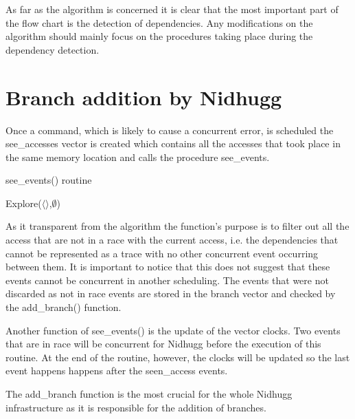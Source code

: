 As far as the algorithm is concerned it is clear that the most important part of the flow chart is the detection of dependencies. Any
modifications on the algorithm should mainly focus on the procedures taking place during the dependency detection.


\section{Branch addition by Nidhugg}

Once a command, which is likely to cause a concurrent error, is scheduled the see\_accesses vector is created which contains all the accesses that took place
in the same memory location and calls the procedure see\_events.

\begin{algorithm}
    \caption{see\_events() routine}
    Explore($\langle \rangle$,$\emptyset$)\;
\end{algorithm}

As it transparent from the algorithm the function's purpose is to filter out all the access that are not in a race with the current access,
i.e. the dependencies that cannot be represented as a trace with no other concurrent event occurring between them. It is important to notice
that this does not suggest that these events cannot be concurrent in another scheduling. The events that were not discarded as not in race events
are stored in the branch vector and checked by the add\_branch() function.

Another function of see\_events() is the update of the vector clocks. Two events that are in race will be concurrent for Nidhugg before the execution
of this routine. At the end of the routine, however, the clocks will be updated so the last event happens happens after the seen\_access events.

The add\_branch function is the most crucial for the whole Nidhugg infrastructure as it is responsible for the addition of branches.

